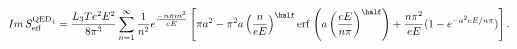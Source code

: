 \begin{equation}
\label{Eq_0614}
Im \, S^{\text{QED}_4}_{\text{eff}}
  = \frac{L_3 T e^2 E^2}{8 \pi^3}
  \sum^{\infty}_{n=1} \frac{1}{n^2} e^{\textstyle{\frac{-n\pi m^2}{eE}}}
  \left[
  \pi a^2 - \pi^2 a \left(\frac{n}{eE}\right)^{\half}
  \text{erf} \, \left(a\left(\frac{eE}{n\pi}\right)^{\half}\right)
  + \frac{n\pi^2}{eE} (1 - e^{-a^2 e E / n\pi})
  \right].
\end{equation}

